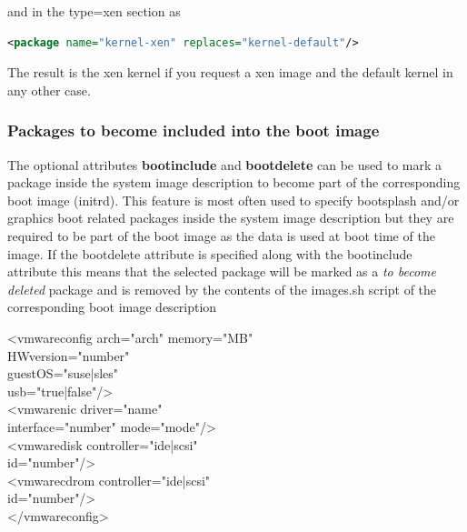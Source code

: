 and in the type=xen section as

\begin{lstlisting}[language=xml]
<package name="kernel-xen" replaces="kernel-default"/>
\end{lstlisting}

The result is the xen kernel if you request a xen
image and the default kernel in any other case.

\subsubsection{Packages to become included into the boot image}
The optional attributes \textbf{bootinclude} and \textbf{bootdelete}
can be used to mark a package inside the system image description to
become part of the corresponding boot image (initrd). This feature
is most often used to specify bootsplash and/or graphics boot related
packages inside the system image description but they are required
to be part of the boot image as the data is used at boot time
of the image. If the bootdelete attribute is specified along with
the bootinclude attribute this means that the selected package
will be marked as a \textit{to become deleted} package and is
removed by the contents of the images.sh script of the corresponding
boot image description

\begin{Command}{12cm}
<vmwareconfig arch="arch" memory="MB"\\
\hspace*{2.5cm}HWversion="number"\\
\hspace*{2.5cm}guestOS="suse|sles"\\
\hspace*{2.5cm}usb="true|false"/>\\
\hspace*{1cm}<vmwarenic driver="name"\\
\hspace*{2.5cm}interface="number" mode="mode"/>\\
\hspace*{1cm}<vmwaredisk controller="ide|scsi"\\
\hspace*{2.5cm}id="number"/>\\
\hspace*{1cm}<vmwarecdrom controller="ide|scsi"\\
\hspace*{2.5cm}id="number"/>\\
</vmwareconfig>
\end{Command}

